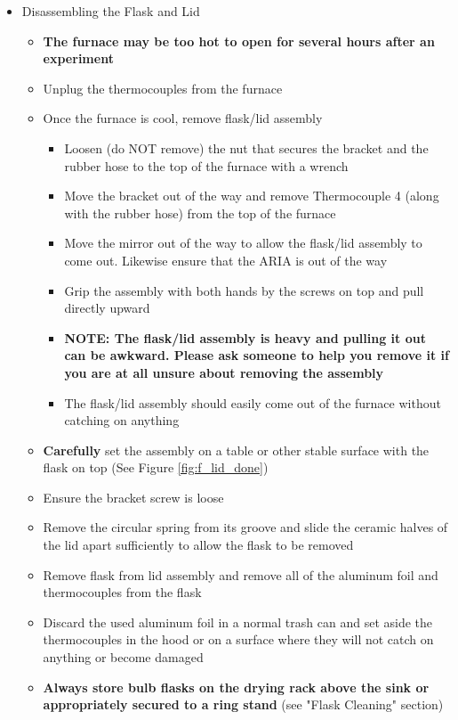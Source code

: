 \documentclass[letterpaper,11pt]{article}
\begin{document}
\begin{itemize}
    \item Disassembling the Flask and Lid
        \begin{itemize}
        \item \textbf{The furnace may be too hot to open for several hours after
             an experiment}
        \item Unplug the thermocouples from the furnace
        \item Once the furnace is cool, remove flask/lid assembly
            \begin{itemize}
            \item Loosen (do NOT remove) the nut that secures the bracket and 
                the rubber hose to the top of the furnace with a wrench
            \item Move the bracket out of the way and remove Thermocouple 4 
                (along with the rubber hose) from the top of the furnace
            \item Move the mirror out of the way to allow the flask/lid assembly
                to come out. Likewise ensure that the ARIA is out of the way
            \item Grip the assembly with both hands by the screws on top and 
                pull directly upward
            \item \textbf{NOTE: The flask/lid assembly is heavy and pulling it  
                out can be awkward. Please ask someone to help you remove it 
                if you are at all unsure about removing the assembly}
            \item The flask/lid assembly should easily come out of the furnace 
                without catching on anything
            \end{itemize}
        
        \item \textbf{Carefully} set the assembly on a table or other stable 
            surface with the flask on top (See Figure \ref{fig:f_lid_done})
        \item Ensure the bracket screw is loose
        \item Remove the circular spring from its groove and slide the ceramic
            halves of the lid apart sufficiently to allow the flask to be 
            removed
        \item Remove flask from lid assembly and  remove all of the aluminum 
            foil and thermocouples from the flask
        \item Discard the used aluminum foil in a normal trash can and set 
            aside the thermocouples in the hood or on a surface where they will
            not catch on anything or become damaged
        \item \textbf{Always store bulb flasks on the drying rack above the sink 
            or appropriately secured to a ring stand} (see "Flask Cleaning"
             section)
        \end{itemize}
    

\end{itemize}
\end{document}
